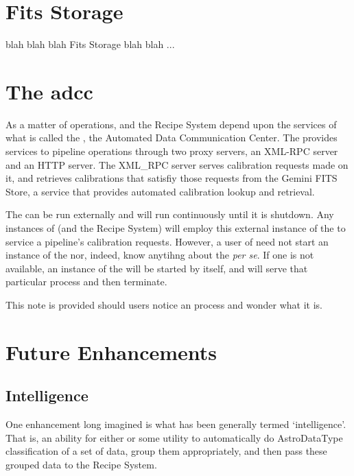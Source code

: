 \documentclass[letterpaper,10pt,english]{sphinxmanual}
\begin{document}
\section{Fits Storage}
\label{discuss:fits-storage}\label{discuss:fitsstore}
blah blah blah Fits Storage blah blah ...


\section{The adcc}
\label{discuss:adcc}\label{discuss:the-adcc}
As a matter of operations,  and the Recipe System depend upon the
services of what is called the , the Automated Data Communication Center.
The  provides services to pipeline operations through two proxy servers,
an XML-RPC server and an HTTP server. The XML\_RPC server serves calibration
requests made on it, and retrieves calibrations that satisfiy those requests
from the Gemini FITS Store, a service that provides automated calibration
lookup and retrieval.

The  can be run externally and will run continuously until it is
shutdown. Any instances of  (and the Recipe System) will employ
this external instance of the  to service a pipeline's calibration
requests. However, a user of  need not start an instance of the
 nor, indeed, know anytihng about the  \emph{per se}. If one is not
available, an instance of the  will be started by  itself,
and will serve that particular  process and then terminate.

This note is provided should users notice an  process and wonder what
it is.


\section{Future Enhancements}
\label{discuss:future-enhancements}

\subsection{Intelligence}
\label{discuss:intelligence}
One enhancement long imagined is what has been generally termed `intelligence'.
That is, an ability for either  or some utility to automatically do
AstroDataType classification of a set of data, group them appropriately, and
then pass these grouped data to the Recipe System.
\end{document}
